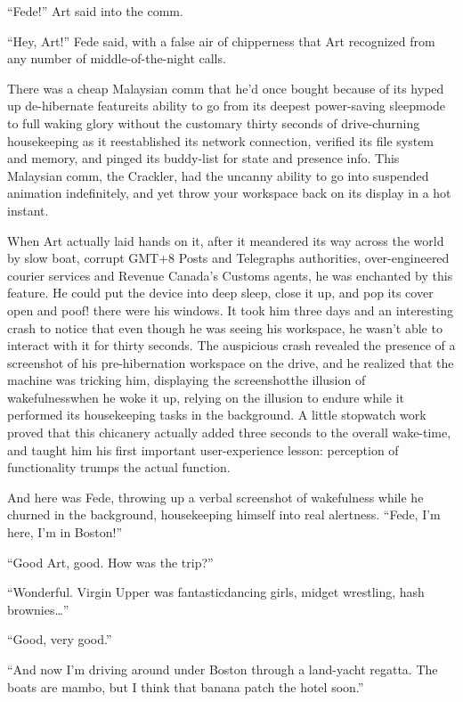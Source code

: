 “Fede!” Art said into the comm.

“Hey, Art!” Fede said, with a false air of chipperness that Art
recognized from any number of middle-of-the-night calls.

There was a cheap Malaysian comm that he’d once bought because of
its hyped up de-hibernate feature{\dash}its ability to go from its
deepest power-saving sleepmode to full waking glory without the
customary thirty seconds of drive-churning housekeeping as it
reestablished its network connection, verified its file system and
memory, and pinged its buddy-list for state and presence info. This
Malaysian comm, the Crackler, had the uncanny ability to go into
suspended animation indefinitely, and yet throw your workspace back
on its display in a hot instant.

When Art actually laid hands on it, after it meandered its way
across the world by slow boat, corrupt GMT+8 Posts and Telegraphs
authorities, over-engineered courier services and Revenue Canada’s
Customs agents, he was enchanted by this feature. He could put the
device into deep sleep, close it up, and pop its cover open and
poof! there were his windows. It took him three days and an
interesting crash to notice that even though he was seeing his
workspace, he wasn’t able to interact with it for thirty seconds.
The auspicious crash revealed the presence of a screenshot of his
pre-hibernation workspace on the drive, and he realized that the
machine was tricking him, displaying the screenshot{\dash}the illusion of
wakefulness{\dash}when he woke it up, relying on the illusion to endure
while it performed its housekeeping tasks in the background. A
little stopwatch work proved that this chicanery actually added
three seconds to the overall wake-time, and taught him his first
important user-experience lesson: perception of functionality
trumps the actual function.

And here was Fede, throwing up a verbal screenshot of wakefulness
while he churned in the background, housekeeping himself into real
alertness. “Fede, I’m here, I’m in Boston!”

“Good Art, good. How was the trip?”

“Wonderful. Virgin Upper was fantastic{\dash}dancing girls, midget
wres\-tling, hash brownies\ldots{}”

“Good, very good.”

“And now I’m driving around under Boston through a land-yacht
regatta. The boats are mambo, but I think that banana patch the
hotel soon.”

